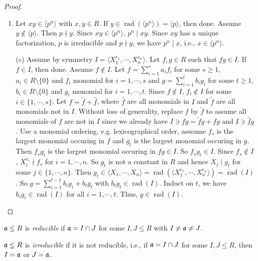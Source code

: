 \begin{proof}
    \begin{enumerate}
        \item Let $xy \in \langle p^{n} \rangle$ with $x,y \in R$. If $y \in \operatorname{rad}(\langle p^{n} \rangle) = \langle p \rangle$, then done. Assume $y \not \in \langle p \rangle$. Then $p \nmid y$. Since $xy \in \langle p^{n} \rangle$, $p^{n} \mid xy$. Since $xy$ has a unique factorization, $p$ is irreducible and $p \nmid y$, we have $p^{n} \mid x$, i.e., $x \in \langle p^{n} \rangle$.
        \item [(c)]  Assume by symmetry $I = \langle X_1^{e_1},\cdots,X_n^{e_n} \rangle$. Let $f,g \in R$ such that $fg \in I$. If $f \in I$, then done. Assume $f \not\in I$. Let $f = \sum_{i=1}^{s}a_if_i$ for some $s \geq 1$, $a_i \in R \setminus \{0\}$ and $f_i$ monomial for $i = 1,\cdots,s$ and $g = \sum_{i=1}^{t}b_ig_i$ for some $t \geq 1$, $b_i \in R \setminus \{0\}$ and $g_i$ monomial for $i = 1,\cdots,t$. Since $f \not \in I$, $f_i \not \in I$ for some $i \in \{1,\cdots,s\}$. Let $f = \tilde f + \hat f$, where $\hat f$ are all monomials in $I$ and $\tilde f$ are all monomials not in $I$. Without loss of generality, replace $f$ by $\tilde f$ to assume all monomials of $f$ are not in $I$ since we already have $I \ni fg = \tilde f g + \hat fg$ and $I \ni \hat fg$. Use a monomial ordering, e.g. lexicographical order, asssume $f_s$ is the largest monomial occuring in $f$ and $g_t$ is the largest monomial occuring in $g$. Then $f_sg_t$ is the largest monomial occuring in $fg \in I$. So $f_sg_t \in I$. Since $f_s \not \in I$, $X_i^{e_i} \nmid f_s$ for $i = 1,\cdots,n$. So $g_t$ is not a constant in $R$ and hence $X_j \mid g_t$ for some $j \in \{1,\cdots,n\}$. Then $g_t \in \langle X_1,\cdots,X_n \rangle = \operatorname{rad}(\langle X_1^{e_1},\cdots,X_n^{e_n} \rangle) = \operatorname{rad}(I)$. So $g = \sum_{i=1}^{t-1}b_ig_i + b_tg_t$ with $b_tg_t \in \operatorname{rad}(I)$. Induct on $t$, we have $b_ig_i \in \operatorname{rad}(I)$ for all $i = 1,\cdots,t$. Thus, $g \in \operatorname{rad}(I)$. \qedhere
    \end{enumerate}
\end{proof}

\begin{definition}
    $\mathfrak{a} \lneq R$ is \emph{reducible} if $\mathfrak{a} = I \cap J$ for some $I,J \leq R$ with $I \neq \mathfrak{a} \neq J$. \par
    $\mathfrak{a} \lneq R$ is \emph{irreducible} if it is not reducible, i.e., if $\mathfrak{a} = I \cap J$ for some $I,J \leq R$, then $I = \mathfrak{a}$ or $J = \mathfrak{a}$.
\end{definition}

